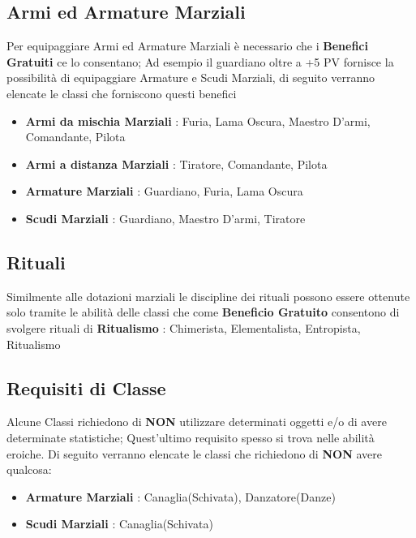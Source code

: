 \documentclass{article}
\begin{document}
\subsection{Armi ed Armature Marziali}
Per equipaggiare Armi ed Armature Marziali è necessario che i \textbf{Benefici Gratuiti} ce lo consentano; Ad esempio il guardiano oltre a +5 PV fornisce la possibilità di equipaggiare Armature e Scudi Marziali, di seguito verranno elencate le classi che forniscono questi benefici
\begin{itemize}
  \item \textbf{Armi da mischia Marziali} : Furia, Lama Oscura, Maestro D'armi, Comandante, Pilota
  \item \textbf{Armi a distanza Marziali} : Tiratore, Comandante, Pilota
  \item \textbf{Armature Marziali} : Guardiano, Furia, Lama Oscura
  \item \textbf{Scudi Marziali} : Guardiano, Maestro D'armi, Tiratore
\end{itemize}


\subsection{Rituali}
Similmente alle dotazioni marziali le discipline dei rituali possono essere ottenute solo tramite le abilità delle classi che come \textbf{Beneficio Gratuito} consentono di svolgere rituali di \textbf{Ritualismo} : Chimerista, Elementalista, Entropista, Ritualismo

\subsection{Requisiti di Classe}
Alcune Classi richiedono di \textbf{NON} utilizzare determinati oggetti e/o di avere determinate statistiche; Quest'ultimo requisito spesso si trova nelle abilità eroiche.
Di seguito verranno elencate le classi che richiedono di \textbf{NON} avere qualcosa:
\begin{itemize}
  \item \textbf{Armature Marziali} : Canaglia(Schivata), Danzatore(Danze)
  \item \textbf{Scudi Marziali} : Canaglia(Schivata)
\end{itemize}
\newpage
\end{document}
